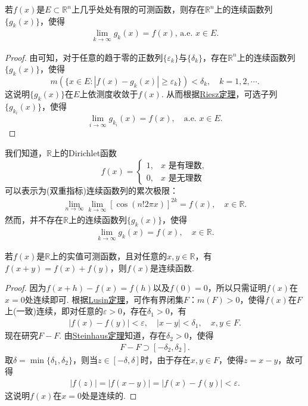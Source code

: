 \documentclass[../../main.tex]{subfiles}
\begin{document}
\begin{corollary}\label{corollary:推论3.20}
若\(f(x)\)是\(E \subset \mathbb{R}^{n}\)上几乎处处有限的可测函数，则存在\(\mathbb{R}^{n}\)上的连续函数列\(\{g_{k}(x)\}\)，使得
\begin{align*}
\lim_{k \to \infty} g_{k}(x) = f(x), \,\text{a.e. } x \in E. 
\end{align*}
\end{corollary}
\begin{proof}
由可知，对于任意的趋于零的正数列\(\{\varepsilon_{k}\}\)与\(\{\delta_{k}\}\)，存在\(\mathbb{R}^{n}\)上的连续函数列\(\{g_{k}(x)\}\)，使得
\[m(\{x \in E: |f(x) - g_{k}(x)| \geqslant \varepsilon_{k}\}) < \delta_{k}, \quad k = 1,2,\cdots.\]
这说明\(\{g_{k}(x)\}\)在\(E\)上依测度收敛于\(f(x)\). 从而根据\hyperref[theorem:Riesz定理]{Riesz定理}，可选子列\(\{g_{k_{i}}(x)\}\)，使得
\[\lim_{i \to \infty} g_{k_{i}}(x) = f(x), \quad \text{a.e. } x \in E.\] 

\end{proof}
\begin{remark}
我们知道，\(\mathbb{R}\)上的Dirichlet函数
\[f(x)=
\begin{cases}
1, & x\text{ 是有理数},\\
0, & x\text{ 是无理数}
\end{cases}\]
可以表示为(双重指标)连续函数列的累次极限：
\begin{align*}
\lim_{n \to \infty}\lim_{k \to \infty}[\cos(n!2\pi x)]^{2k}=f(x),\quad x\in\mathbb{R}.
\end{align*}
然而，并不存在\(\mathbb{R}\)上的连续函数列\(\{g_{k}(x)\}\)，使得
\begin{align*}
\lim_{k \to \infty}g_{k}(x)=f(x),\quad x\in\mathbb{R}.
\end{align*} 
\end{remark}

\begin{example}
若\(f(x)\)是\(\mathbb{R}\)上的实值可测函数，且对任意的\(x, y \in \mathbb{R}\)，有\(f(x + y) = f(x) + f(y)\)，则\(f(x)\)是连续函数.
\end{example}
\begin{proof}
因为\(f(x + h) - f(x) = f(h)\)以及\(f(0) = 0\)，所以只需证明\(f(x)\)在\(x = 0\)处连续即可. 根据\hyperref[theorem:Lusin(卢津)定理]{Lusin定理}，可作有界闭集\(F\)：\(m(F)>0\)，使得\(f(x)\)在\(F\)上(一致)连续，即对任意的\(\varepsilon > 0\)，存在\(\delta_1 > 0\)，有
\begin{align*}
|f(x) - f(y)| < \varepsilon, \quad |x - y| < \delta_1, \quad x, y \in F.
\end{align*}
现在研究\(F - F\). 由\hyperref[theorem:Steinhaus定理]{Steinhaus定理}知道，存在\(\delta_2 > 0\)，使得
\begin{align*}
F - F \supset [-\delta_2, \delta_2].
\end{align*}
取\(\delta = \min\{\delta_1, \delta_2\}\)，则当\(z \in [-\delta, \delta]\)时，由于存在\(x, y \in F\)，使得\(z = x - y\)，故可得
\begin{align*}
|f(z)| = |f(x - y)| = |f(x) - f(y)| < \varepsilon.
\end{align*}
这说明\(f(x)\)在\(x = 0\)处是连续的.

\end{proof}
\end{document}
